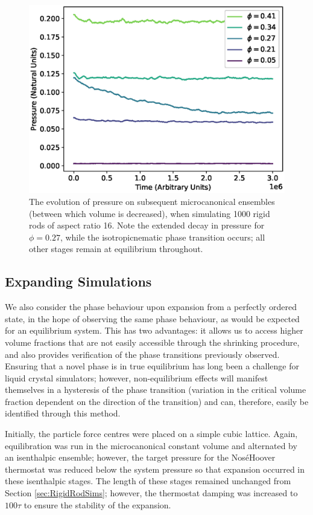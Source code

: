 \documentclass[11pt, a4paper]{article} %
\begin{document}
\begin{figure} [h!]
	\centering
	\includegraphics[width=0.7\linewidth]{Figures/rigidrod_pressureevo}
	\caption{The evolution of pressure on subsequent microcanonical ensembles (between which volume is decreased), when simulating 1000 rigid rods of aspect ratio 16. Note the extended decay in pressure for $\phi  = 0.27$, while the isotropic\textendash nematic phase transition occurs; all other stages remain at equilibrium throughout.}
	\label{fig:rr_pressureevo}
\end{figure} %



\subsection{Expanding Simulations}
We also consider the phase behaviour upon expansion from a perfectly ordered state, in the hope of observing the same phase behaviour, as would be expected for an equilibrium system. This has two advantages: it allows us to access higher volume fractions that are not easily accessible through the shrinking procedure, and also provides verification of the phase transitions previously observed. Ensuring that a novel phase is in true equilibrium has long been a challenge for liquid crystal simulators; however, non-equilibrium effects will manifest themselves in a hysteresis of the phase transition (variation in the critical volume fraction dependent on the direction of the transition) and can, therefore, easily be identified through this method.

Initially, the particle force centres were placed on a simple cubic lattice. Again, equilibration was run in the microcanonical constant volume and alternated by an isenthalpic ensemble; however, the target pressure for the Nos\'e\textendash Hoover thermostat was reduced below the system pressure so that expansion occurred in these isenthalpic stages. The length of these stages remained unchanged from Section \ref{sec:RigidRodSims}; however, the thermostat damping was increased to $100\tau$ to ensure the stability of the expansion.
\end{document}
